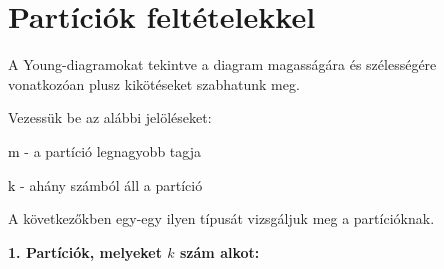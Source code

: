 \section*{Partíciók feltételekkel}

A Young-diagramokat tekintve a diagram magasságára és szélességére
vonatkozóan plusz kikötéseket szabhatunk meg.

\vspace{0.5cm}

\begin{minipage}[c]{0.5\textwidth}%
\vspace{0.2cm}

\begin{center}
\par\end{center}%
\end{minipage}%
\begin{minipage}[c]{0.5\textwidth}%
 Vezessük be az alábbi jelöléseket:

\vspace{0.1cm}

\textcolor{black}{m} - a partíció legnagyobb tagja

\vspace{0.1cm}

\textcolor{black}{k} - ahány számból áll a partíció %
\end{minipage}A következőkben egy-egy ilyen típusát vizsgáljuk meg a partícióknak.

\hspace{0.1cm}

\textbf{1. Partíciók, melyeket $k$ szám alkot:}

\hspace{0cm}

